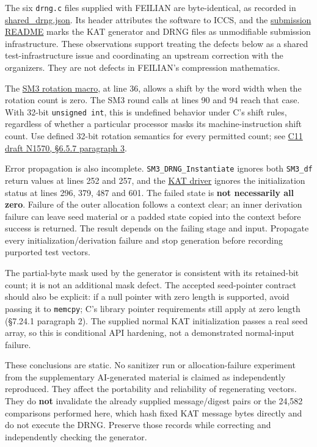 \documentclass[
  english,
  11pt,
  a4paper,
]{article}
\begin{document}
The six \texttt{drng.c} files supplied with FEILIAN are byte-identical,
as recorded in \href{data/shared_drng.json}{shared\_drng.json}. Its
header attributes the software to ICCS, and the
\href{data/SOURCES.md\#source-15}{submission README} marks the KAT
generator and DRNG files as unmodifiable submission infrastructure.
These observations support treating the defects below as a shared
test-infrastructure issue and coordinating an upstream correction with
the organizers. They are not defects in FEILIAN's compression
mathematics.

The \href{data/SOURCES.md\#source-10}{SM3 rotation macro}, at line 36,
allows a shift by the word width when the rotation count is zero. The
SM3 round calls at lines 90 and 94 reach that case. With 32-bit
\texttt{unsigned\ int}, this is undefined behavior under C's shift
rules, regardless of whether a particular processor masks its
machine-instruction shift count. Use defined 32-bit rotation semantics
for every permitted count; see
\href{https://www.open-std.org/jtc1/sc22/wg14/www/docs/n1570.pdf}{C11
draft N1570, §6.5.7 paragraph 3}.

Error propagation is also incomplete. \texttt{SM3\_DRNG\_Instantiate}
ignores both \texttt{SM3\_df} return values at lines 252 and 257, and
the \href{data/SOURCES.md\#source-14}{KAT driver} ignores the
initialization status at lines 296, 379, 487 and 601. The failed state
is \textbf{not necessarily all zero}. Failure of the outer allocation
follows a context clear; an inner derivation failure can leave seed
material or a padded state copied into the context before success is
returned. The result depends on the failing stage and input. Propagate
every initialization/derivation failure and stop generation before
recording purported test vectors.

The partial-byte mask used by the generator is consistent with its
retained-bit count; it is not an additional mask defect. The accepted
seed-pointer contract should also be explicit: if a null pointer with
zero length is supported, avoid passing it to \texttt{memcpy}; C's
library pointer requirements still apply at zero length (§7.24.1
paragraph 2). The supplied normal KAT initialization passes a real seed
array, so this is conditional API hardening, not a demonstrated
normal-input failure.

These conclusions are static. No sanitizer run or allocation-failure
experiment from the supplementary AI-generated material is claimed as
independently reproduced. They affect the portability and reliability of
regenerating vectors. They do \textbf{not} invalidate the already
supplied message/digest pairs or the 24,582 comparisons performed here,
which hash fixed KAT message bytes directly and do not execute the DRNG.
Preserve those records while correcting and independently checking the
generator.
\end{document}
